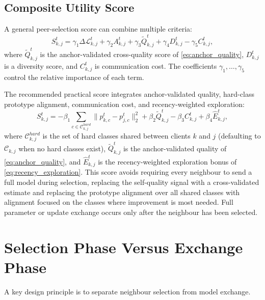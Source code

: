 \documentclass[conference]{IEEEtran}
\begin{document}
\subsection{Composite Utility Score}
\label{subsec:composite-utility-score}
A general peer-selection score can combine multiple criteria:
\begin{equation}
    S_{k,j}^{t}
    =
    \gamma_1 \Delta\mathcal{L}_{k,j}^{t}
    +
    \gamma_2 A_{k,j}^{t}
    +
    \gamma_3 \tilde{Q}_{k,j}^{t}
    +
    \gamma_4 D_{k,j}^{t}
    -
    \gamma_5 C_{k,j}^{t},
    \label{eq:composite_score}
\end{equation}
where \(\tilde{Q}_{k,j}^t\) is the anchor-validated cross-quality score of \eqref{eq:anchor_quality}, \(D_{k,j}^t\) is a diversity score, and \(C_{k,j}^t\) is communication cost. The coefficients \(\gamma_1,\dots,\gamma_5\) control the relative importance of each term.

The recommended practical score integrates anchor-validated quality, hard-class prototype alignment, communication cost, and recency-weighted exploration:
\begin{equation}
    S_{k,j}^{t}
    =
    -\beta_1
    \sum_{c\in\mathcal{C}_{k,j}^{hard}}
    \|p_{k,c}^{t}-p_{j,c}^{t}\|_2^2
    +
    \beta_2 \tilde{Q}_{k,j}^t
    -
    \beta_3 C_{k,j}^t
    +
    \beta_4 \hat{E}_{k,j}^t,
    \label{eq:recommended_score}
\end{equation}
where \(\mathcal{C}_{k,j}^{hard}\) is the set of hard classes shared between clients \(k\) and \(j\) (defaulting to \(\mathcal{C}_{k,j}\) when no hard classes exist), \(\tilde{Q}_{k,j}^t\) is the anchor-validated quality of \eqref{eq:anchor_quality}, and \(\hat{E}_{k,j}^t\) is the recency-weighted exploration bonus of \eqref{eq:recency_exploration}. This score avoids requiring every neighbour to send a full model during selection, replacing the self-quality signal with a cross-validated estimate and replacing the prototype alignment over all shared classes with alignment focused on the classes where improvement is most needed. Full parameter or update exchange occurs only after the neighbour has been selected.

\section{Selection Phase Versus Exchange Phase}
\label{sec:selection-phase-versus-exchange-phase}

A key design principle is to separate neighbour selection from model exchange.
\end{document}
